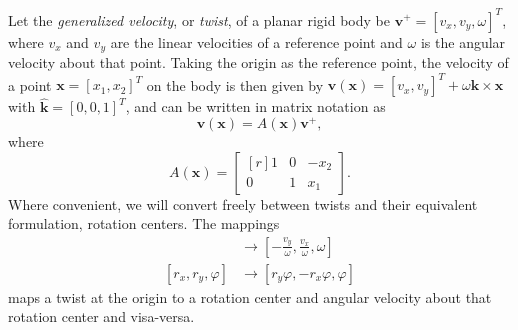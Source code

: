 \documentclass[conference]{IEEEtran}
\begin{document}
Let the \textit{generalized velocity}, or \textit{twist}, of a planar
rigid body be $\mathbf{v}^+ = [v_x, v_y, \omega]^T$, where $v_x$ and
$v_y$ are the linear velocities of a reference point and $\omega$ is
the angular velocity about that point. Taking the origin as the
reference point, the velocity of a point $\mathbf{x} = [x_1,x_2]^T$ on
the body is then given by
$\mathbf{v}(\mathbf{x}) = [v_x, v_y]^T + \omega\hat{\mathbf{k}} \times
\mathbf{x}$
with $\hat{\mathbf{k}} = [0,0,1]^T$, and can be written in matrix
notation as
\begin{equation} \label{eq:generalized-velocity}
\mathbf{v}(\mathbf{x}) = A(\mathbf{x})\mathbf{v}^+,
\end{equation}
where
\begin{equation}
  A(\mathbf{x}) = 
  \begin{bmatrix*}[r]
    1 & 0 & -x_2 \\
    0 & 1 &  x_1
  \end{bmatrix*}.
\end{equation}
Where convenient, we will convert freely between twists and their
equivalent formulation, rotation centers. The mappings
\begin{align}
  [v_x, v_y, \omega] &\rightarrow [-\frac{v_y}{\omega}, \frac{v_x}{\omega}, \omega] \\
  [r_x, r_y, \varphi] &\rightarrow [r_y\varphi, -r_x\varphi, \varphi]
\end{align}
maps a twist at the origin to a rotation center and angular velocity
about that rotation center and visa-versa.
\end{document}
